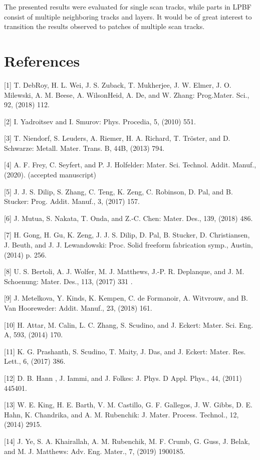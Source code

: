 \documentclass[10pt]{article}
\begin{document}
The presented results were evaluated for single scan tracks, while parts in LPBF consist of multiple neighboring tracks and layers. It would be of great interest to transition the results observed to patches of multiple scan tracks.

\section*{References}
[1] T. DebRoy, H. L. Wei, J. S. Zuback, T. Mukherjee, J. W. Elmer, J. O. Milewski, A. M. Beese, A. WilsonHeid, A. De, and W. Zhang: Prog.Mater. Sci., 92, (2018) 112.

[2] I. Yadroitsev and I. Smurov: Phys. Procedia, 5, (2010) 551.

[3] T. Niendorf, S. Leuders, A. Riemer, H. A. Richard, T. Tröster, and D. Schwarze: Metall. Mater. Trans. B, 44B, (2013) 794.

[4] A. F. Frey, C. Seyfert, and P. J. Holfelder: Mater. Sci. Technol. Addit. Manuf., (2020). (accepted manuscript)

[5] J. J. S. Dilip, S. Zhang, C. Teng, K. Zeng, C. Robinson, D. Pal, and B. Stucker: Prog. Addit. Manuf., 3, (2017) 157.

[6] J. Mutua, S. Nakata, T. Onda, and Z.-C. Chen: Mater. Des., 139, (2018) 486.

[7] H. Gong, H. Gu, K. Zeng, J. J. S. Dilip, D. Pal, B. Stucker, D. Christiansen, J. Beuth, and J. J. Lewandowski: Proc. Solid freeform fabrication symp., Austin, (2014) p. 256.

[8] U. S. Bertoli, A. J. Wolfer, M. J. Matthews, J.-P. R. Deplanque, and J. M. Schoenung: Mater. Des., 113, (2017) 331 .

[9] J. Metelkova, Y. Kinds, K. Kempen, C. de Formanoir, A. Witvrouw, and B. Van Hooreweder: Addit. Manuf., 23, (2018) 161.

[10] H. Attar, M. Calin, L. C. Zhang, S. Scudino, and J. Eckert: Mater. Sci. Eng. A, 593, (2014) 170.

[11] K. G. Prashanth, S. Scudino, T. Maity, J. Das, and J. Eckert: Mater. Res. Lett., 6, (2017) 386.

[12] D. B. Hann , J. Iammi, and J. Folkes: J. Phys. D Appl. Phys., 44, (2011) 445401.

[13] W. E. King, H. E. Barth, V. M. Castillo, G. F. Gallegos, J. W. Gibbs, D. E. Hahn, K. Chandrika, and A. M. Rubenchik: J. Mater. Process. Technol., 12, (2014) 2915.

[14] J. Ye, S. A. Khairallah, A. M. Rubenchik, M. F. Crumb, G. Guss, J. Belak, and M. J. Matthews: Adv. Eng. Mater., 7, (2019) 1900185.
\end{document}
